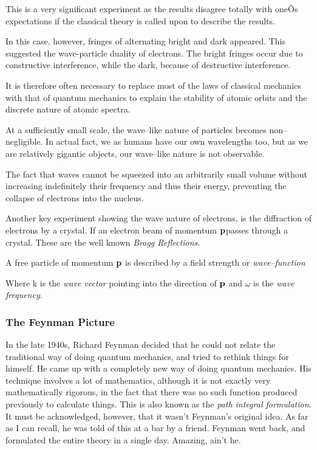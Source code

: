 This is a very significant experiment as the results disagree totally with oneÕs expectations if the classical theory is called upon to describe the results. 

In this case, however, fringes of alternating bright and dark appeared. This suggested the wave-particle duality of electrons. The bright fringes occur due to constructive interference, while the dark, because of destructive interference.

It is therefore often necessary to replace most of the laws of classical mechanics with that of quantum mechanics to explain the stability of atomic orbits and the discrete nature of atomic spectra.

At a sufficiently small scale, the wave--like nature of particles becomes non--negligible. In actual fact, we as humans have our own wavelengths too, but as we are relatively gigantic objects, our wave--like nature is not observable.

The fact that waves cannot be squeezed into an arbitrarily small volume without increasing indefinitely their frequency and thus their energy, preventing the collapse of electrons into the nucleus.

Another key experiment showing the wave nature of electrons, is the diffraction of electrons by a crystal. If an electron beam of momentum $\mathbf{p}$passes through a crystal. These are the well known \emph{Bragg Reflections}.

A free particle of momentum $\mathbf{p}$ is described by a field strength or \emph{wave--function}


Where k is the \emph{wave vector} pointing into the direction of $\mathbf{p}$ and $\omega$ is the \emph{wave frequency}.

\subsubsection{The Feynman Picture}
In the late 1940s, Richard Feynman decided that he could not relate
the traditional way of doing quantum mechanics, and tried to rethink
things for himself. He came up with a completely new way of doing
quantum mechanics. His technique involves a lot of mathematics,
although it is not exactly very mathematically rigorous, in the fact
that there was no such function produced previously to calculate
things. This is also known as the \emph{path integral formulation}. It
must be acknowledged, however, that it wasn't Feynman's original idea.
As far as I can recall, he was told of this at a bar by a friend.
Feynman went back, and formulated the entire theory in a single day.
Amazing, ain't he.

